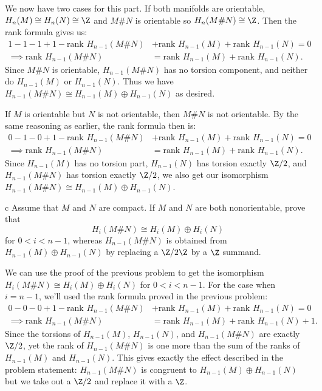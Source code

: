 \documentclass[11pt,letterpaper]{article}
\begin{document}
\begin{solution}
    \quad We now have two cases for this part. If both manifolds are orientable, $H_n(M)\cong H_n(N) \cong \Z$ and $M\# N$ is orientable so $H_n(M\# N)\cong \Z$. Then the rank formula gives us:
    \[
        \begin{aligned}
            1 - 1 - 1 + 1 - \text{rank }H_{n-1}(M\# N) &+ \text{rank }H_{n-1}(M) +\text{rank }H_{n-1}(N) = 0 \\
            \implies \text{rank }H_{n-1}(M\# N) &= \text{rank }H_{n-1}(M) +\text{rank }H_{n-1}(N).
        \end{aligned}
    \] 
    Since $M\# N$ is orientable, $H_{n-1}(M\# N)$ has no torsion component, and neither do $H_{n-1}(M)$ or $H_{n-1}(N)$. Thus we have $H_{n-1}(M\# N) \cong H_{n-1}(M)\oplus H_{n-1}(N)$ as desired.

    \quad If $M$ is orientable but $N$ is not orientable, then $M\# N$ is not orientable. By the same reasoning as earlier, the rank formula then is:
    \[
        \begin{aligned}
            0 - 1 - 0 + 1 - \text{rank }H_{n-1}(M\# N) &+ \text{rank }H_{n-1}(M) +\text{rank }H_{n-1}(N) = 0 \\
            \implies \text{rank }H_{n-1}(M\# N) &= \text{rank }H_{n-1}(M) +\text{rank }H_{n-1}(N).
        \end{aligned}
    \] 
    Since $H_{n-1}(M)$ has no torsion part, $H_{n-1}(N)$ has torsion exactly $\Z /2$, and $H_{n-1}(M\# N)$ has torsion exactly $\Z /2$, we also get our isomorphism $H_{n-1}(M\# N) \cong H_{n-1}(M)\oplus H_{n-1}(N)$.

     \begin{partproblem}{c} 
         Assume that $M$ and $N$ are compact. If $M$ and $N$ are both nonorientable, prove that
         \[
             H_i(M\#N)\cong H_i(M)\oplus H_i(N)
         \] 
         for $0<i<n-1$, whereas $H_{n-1}(M\# N)$ is obtained from $H_{n-1}(M)\oplus H_{n-1}(N)$ by replacing a $\Z /2\Z$ by a $\Z$ summand. 
     \end{partproblem}

     \quad We can use the proof of the previous problem to get the isomorphism $H_i(M\# N)\cong H_i(M)\oplus H_i(N)$ for $0 < i < n-1$. For the case when $i=n-1$, we'll used the rank formula proved in the previous problem:
     \[
        \begin{aligned}
            0 - 0 - 0 + 1 - \text{rank }H_{n-1}(M\# N) &+ \text{rank }H_{n-1}(M) +\text{rank }H_{n-1}(N) = 0 \\
            \implies \text{rank }H_{n-1}(M\# N) &= \text{rank }H_{n-1}(M) +\text{rank }H_{n-1}(N)+1.
        \end{aligned}
    \]
    Since the torsions of $H_{n-1}(M)$, $H_{n-1}(N)$, and $H_{n-1}(M\# N)$ are exactly $\Z /2$, yet the rank of $H_{n-1}(M\# N)$ is one more than the sum of the ranks of $H_{n-1}(M)$ and $H_{n-1}(N)$. This gives exactly the effect described in the problem statement: $H_{n-1}(M\# N)$ is congruent to $H_{n-1}(M)\oplus H_{n-1}(N)$ but we take out a $\Z/2$ and replace it with a $\Z$.   
\end{solution}
\end{document}
